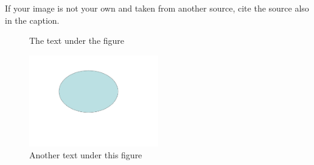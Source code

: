 If your image is not your own and taken from another source, cite the source
also in the caption.

\begin{figure}[htbp]
  \centering


  \caption{The text under the figure \cite{AfratiPODS2002}}
  \label{fig:labelOfFigure1}
\end{figure}


\begin{figure}[htbp]
  \centering
  \includegraphics[width=0.5\textwidth]{Figure2.pdf}
  \caption{Another text under this figure \cite{LenzeriniPODS2002}}
  \label{fig:labelOfNextFigure}
\end{figure}

